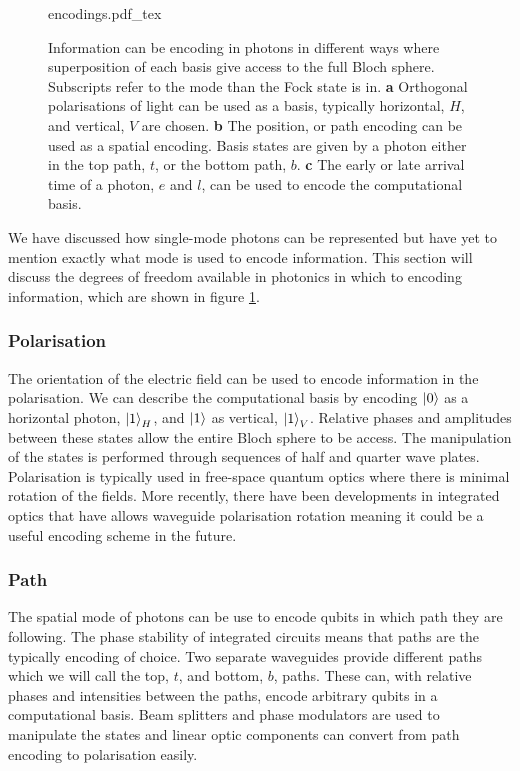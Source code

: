 \begin{figure}
	\centering
	\def\svgwidth{\textwidth}
   	{encodings.pdf_tex}
   	\caption[Quantum information encoding with photons]{Information can be encoding in photons in different ways where superposition of each basis give access to the full Bloch sphere. Subscripts refer to the mode than the Fock state is in. \textbf{a} Orthogonal polarisations of light can be used as a basis, typically horizontal, $H$, and vertical, $V$ are chosen. \textbf{b} The position, or path encoding can be used as a spatial encoding. Basis states are given by a photon either in the top path, $t$, or the bottom path, $b$. \textbf{c} The early or late arrival time of a photon, $e$ and $l$, can be used to encode the computational basis.}
   	\label{fig:encodings}
\end{figure}

We have discussed how single-mode photons can be represented but have yet to mention exactly what mode is used to encode information. This section will discuss the degrees of freedom available in photonics in which to encoding information, which are shown in figure \ref{fig:encodings}.

\subsubsection*{Polarisation}

The orientation of the electric field can be used to encode information in the polarisation.  We can describe the computational basis by encoding $\ket{0}$ as a horizontal photon, $\ket{1}_H$, and $\ket{1}$ as vertical, $\ket{1}_V$. Relative phases and amplitudes between these states allow the entire Bloch sphere to be access. The manipulation of the states is performed through sequences of half and quarter wave plates. Polarisation is typically used in free-space quantum optics where there is minimal rotation of the fields. More recently, there have been developments in integrated optics that have allows waveguide polarisation rotation \cite{smit2014} meaning it could be a useful encoding scheme in the future.

\subsubsection*{Path}

The spatial mode of photons can be use to encode qubits in which path they are following. The phase stability of integrated circuits means that paths are the typically encoding of choice. Two separate waveguides provide different paths which we will call the top, $t$, and bottom, $b$, paths. These can, with relative phases and intensities between the paths, encode arbitrary qubits in a computational basis. Beam splitters and phase modulators are used to manipulate the states and linear optic components can convert from path encoding to polarisation easily. 


